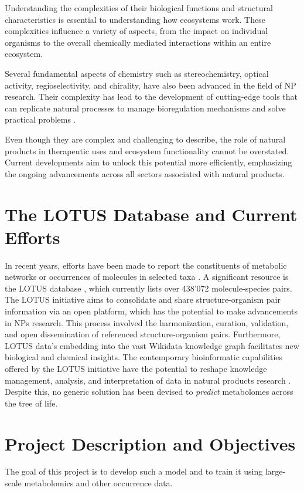 \documentclass[
11pt, %
oneside, %
english, %
singlespacing, %
headsepline, %
chapterinoneline, %
]{MastersDoctoralThesis} %
\begin{document}
Understanding the complexities of their biological functions and structural characteristics is essential to understanding how ecosystems work. These complexities influence a variety of aspects, from the impact on individual organisms to the overall chemically mediated interactions within an entire ecosystem.

Several fundamental aspects of chemistry such as stereochemistry, optical activity, regioselectivity, and chirality, have also been advanced in the field of NP research. Their complexity has lead to the development of cutting-edge tools that can replicate natural processes to manage bioregulation mechanisms and solve practical problems \cite{drasarGrowingImportanceNatural2019}. 

Even though they are complex and challenging to describe, the role of natural products in therapeutic uses and ecosystem functionality cannot be overstated. Current developments aim to unlock this potential more efficiently, emphasizing the ongoing advancements across all sectors associated with natural products.

\section{The LOTUS Database and Current Efforts}
In recent years, efforts have been made to report the constituents of metabolic networks or occurrences of molecules in selected taxa \cite{rodriguez-lopezPhylogenyAwareChemoinformaticAnalysis2022}. A significant resource is the LOTUS database \cite{rutzLOTUSInitiativeOpen2022}, which currently lists over 438'072 molecule-species pairs. The LOTUS initiative aims to consolidate and share structure-organism pair information via an open platform, which has the potential to make advancements in NPs research. This process involved the harmonization, curation, validation, and open dissemination of referenced structure-organism pairs. Furthermore, LOTUS data's embedding into the vast Wikidata knowledge graph facilitates new biological and chemical insights. The contemporary bioinformatic capabilities offered by the LOTUS initiative have the potential to reshape knowledge management, analysis, and interpretation of data in natural products research \cite{rutzLOTUSInitiativeOpen2022}. Despite this, no generic solution has been devised to \textit{predict} metabolomes across the tree of life.

\section{Project Description and Objectives}
The goal of this project is to develop such a model and to train it using large-scale metabolomics and other occurrence data.
\end{document}

